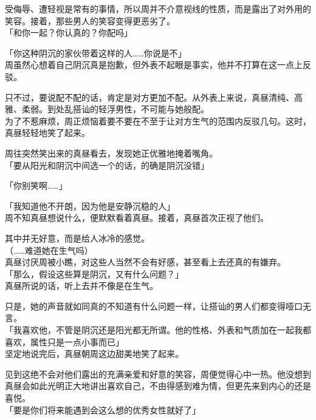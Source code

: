 受侮辱、遭轻视是常有的事情，所以周并不介意视线的性质，而是露出了对外用的笑容。接着，那些男人的笑容变得更恶劣了。\\

「和你一起？你认真的？你配吗」

「你这种阴沉的家伙带着这样的人……你说是不」\\

周虽然心想着自己阴沉真是抱歉，但外表不起眼是事实，他并不打算在这一点上反驳。

只不过，要说配不配的话，肯定是对方更加不配。从外表上来说，真昼清纯、高雅、柔弱。到处乱搭讪的轻浮男性，不可能与她般配。\\

为了不惹麻烦，周正烦恼着要不要在不至于让对方生气的范围内反驳几句。这时，真昼轻轻地笑了起来。

周往突然笑出来的真昼看去，发现她正优雅地掩着嘴角。\\

「要从阳光和阴沉中间选一个的话，的确是阴沉没错」

「你别笑啊……」

「我知道他不开朗，因为他是安静沉稳的人」\\

周不知真昼想说什么，便默默看着真昼。接着，真昼首次正视了他们。

其中并无好意，而是给人冰冷的感觉。\\

（……难道她在生气吗）\\

真昼讨厌周被小瞧，对这些人当然不会有好感，甚至看上去还真的有嫌弃。\\

「那么，假设这些算是阴沉，又有什么问题？」\\

真昼所说的话，听上去并不像是在生气。

只是，她的声音就如同真的不知道有什么问题一样，让搭讪的男人们都变得哑口无言。\\

「我喜欢他，不管是阴沉还是阳光都无所谓。他的性格、外表和气质加在一起我都喜欢，属性只是一点小事而已」\\

坚定地说完后，真昼朝周这边甜美地笑了起来。

见到这绝不会对他们露出的充满亲爱和好意的笑容，周便觉得心中一热。他没想到真昼会如此光明正大地讲出喜欢自己，不由得感到难为情，但更先来到内心的还是喜悦。\\

「要是你们将来能遇到会这么想的优秀女性就好了」\\

